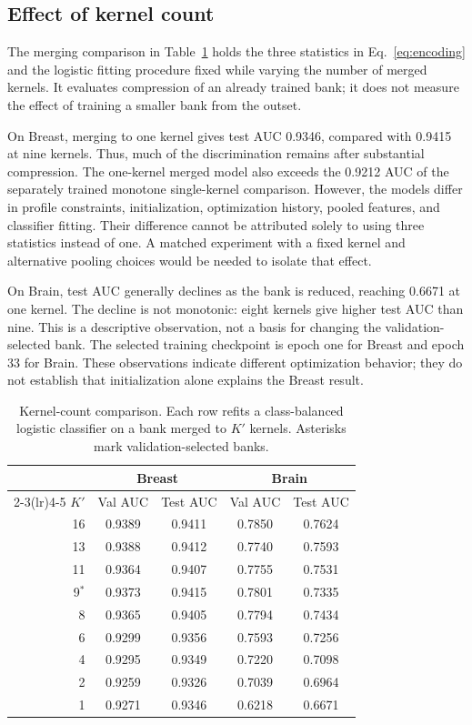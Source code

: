 \documentclass[10pt,twocolumn]{article}
\begin{document}
\subsection{Effect of kernel count}
\label{sec:results-sweep}
The merging comparison in Table~\ref{tab:sweep} holds the three statistics in Eq.~\eqref{eq:encoding} and the logistic fitting procedure fixed while varying the number of merged kernels. It evaluates compression of an already trained bank; it does not measure the effect of training a smaller bank from the outset.

On Breast, merging to one kernel gives test AUC 0.9346, compared with 0.9415 at nine kernels. Thus, much of the discrimination remains after substantial compression. The one-kernel merged model also exceeds the 0.9212 AUC of the separately trained monotone single-kernel comparison. However, the models differ in profile constraints, initialization, optimization history, pooled features, and classifier fitting. Their difference cannot be attributed solely to using three statistics instead of one. A matched experiment with a fixed kernel and alternative pooling choices would be needed to isolate that effect.

On Brain, test AUC generally declines as the bank is reduced, reaching 0.6671 at one kernel. The decline is not monotonic: eight kernels give higher test AUC than nine. This is a descriptive observation, not a basis for changing the validation-selected bank. The selected training checkpoint is epoch one for Breast and epoch 33 for Brain. These observations indicate different optimization behavior; they do not establish that initialization alone explains the Breast result.

\begin{table}[!t]
\centering
\caption{Kernel-count comparison. Each row refits a class-balanced logistic classifier on a bank merged to $K'$ kernels. Asterisks mark validation-selected banks.}
\label{tab:sweep}
\footnotesize
\begin{tabular}{rcc@{\hskip 1.2em}cc}
\toprule
& \multicolumn{2}{c}{Breast} & \multicolumn{2}{c}{Brain}\\
\cmidrule(lr){2-3}\cmidrule(lr){4-5}
$K'$ & Val AUC & Test AUC & Val AUC & Test AUC\\
\midrule
16 & 0.9389 & 0.9411 & 0.7850 & 0.7624\\
13 & 0.9388 & 0.9412 & 0.7740 & 0.7593\\
11 & 0.9364 & 0.9407 & 0.7755 & 0.7531\\
9$^*$ & 0.9373 & 0.9415 & 0.7801 & 0.7335\\
8 & 0.9365 & 0.9405 & 0.7794 & 0.7434\\
6 & 0.9299 & 0.9356 & 0.7593 & 0.7256\\
4 & 0.9295 & 0.9349 & 0.7220 & 0.7098\\
2 & 0.9259 & 0.9326 & 0.7039 & 0.6964\\
1 & 0.9271 & 0.9346 & 0.6218 & 0.6671\\
\bottomrule
\end{tabular}
\end{table}
\end{document}
